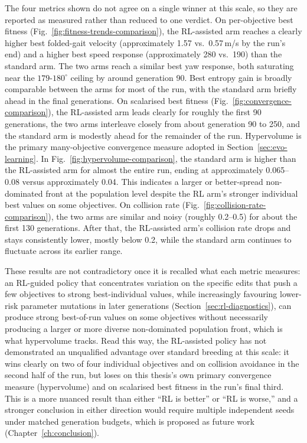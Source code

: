 \documentclass[12pt,a4paper]{report}
\begin{document}
The four metrics shown do not agree on a single winner at this scale, so they are reported as measured rather than reduced to one verdict. On per-objective best fitness (Fig.~\ref{fig:fitness-trends-comparison}), the RL-assisted arm reaches a clearly higher best folded-gait velocity (approximately 1.57 vs.\ 0.57\,m/s by the run's end) and a higher best speed response (approximately 280 vs.\ 190) than the standard arm. The two arms reach a similar best yaw response, both saturating near the $179$-$180^\circ$ ceiling by around generation 90. Best entropy gain is broadly comparable between the arms for most of the run, with the standard arm briefly ahead in the final generations. On scalarised best fitness (Fig.~\ref{fig:convergence-comparison}), the RL-assisted arm leads clearly for roughly the first 90 generations, the two arms interleave closely from about generation 90 to 250, and the standard arm is modestly ahead for the remainder of the run. Hypervolume is the primary many-objective convergence measure adopted in Section~\ref{sec:evo-learning}. In Fig.~\ref{fig:hypervolume-comparison}, the standard arm is higher than the RL-assisted arm for almost the entire run, ending at approximately 0.065--0.08 versus approximately 0.04. This indicates a larger or better-spread non-dominated front at the population level despite the RL arm's stronger individual best values on some objectives. On collision rate (Fig.~\ref{fig:collision-rate-comparison}), the two arms are similar and noisy (roughly 0.2--0.5) for about the first 130 generations. After that, the RL-assisted arm's collision rate drops and stays consistently lower, mostly below 0.2, while the standard arm continues to fluctuate across its earlier range.

These results are not contradictory once it is recalled what each metric measures: an RL-guided policy that concentrates variation on the specific edits that push a few objectives to strong best-individual values, while increasingly favouring lower-risk parameter mutations in later generations (Section~\ref{sec:rl-diagnostics}), can produce strong best-of-run values on some objectives without necessarily producing a larger or more diverse non-dominated population front, which is what hypervolume tracks. Read this way, the RL-assisted policy has not demonstrated an unqualified advantage over standard breeding at this scale: it wins clearly on two of four individual objectives and on collision avoidance in the second half of the run, but loses on this thesis's own primary convergence measure (hypervolume) and on scalarised best fitness in the run's final third. This is a more nuanced result than either ``RL is better'' or ``RL is worse,'' and a stronger conclusion in either direction would require multiple independent seeds under matched generation budgets, which is proposed as future work (Chapter~\ref{ch:conclusion}).
\end{document}
